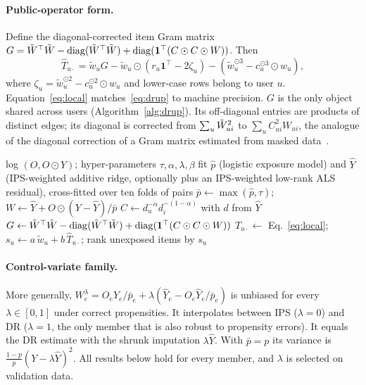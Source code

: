 \paragraph{Public-operator form.}
Define the diagonal-corrected item Gram matrix
$G=\tilde W^\top\tilde W-\operatorname{diag}(\tilde W^\top\tilde W)+\operatorname{diag}(\mathbf 1^\top(C\odot C\odot W))$. Then
\begin{equation}\label{eq:local}
\hat T_{u\cdot}=\tilde w_uG-\tilde w_u\odot(r_u\mathbf 1^\top-2\zeta_u)-(\tilde w_u^{\odot3}-c_u^{\odot3}\odot w_u),
\end{equation}
where $\zeta_u=\tilde w_u^{\odot2}-c_u^{\odot2}\odot w_u$ and lower-case rows
belong to user $u$. Equation~\eqref{eq:local} matches~\eqref{eq:drup} to machine
precision. $G$ is the only object shared across users
(Algorithm~\ref{alg:drup}). Its off-diagonal entries are products of distinct
edges; its diagonal is corrected from $\sum_u\tilde W_{ui}^2$ to
$\sum_uC_{ui}^2W_{ui}$, the analogue of the diagonal correction of a Gram
matrix estimated from masked data~\cite{lounici2014}.

\begin{algorithm}[t]
\caption{DRUP (training-free)}\label{alg:drup}
\begin{algorithmic}[1]
\Require log $(O,O\odot Y)$; hyper-parameters $\tau,\alpha,\lambda,\beta$
\State fit $\hat p$ (logistic exposure model) and $\hat Y$ (IPS-weighted additive ridge, optionally plus an IPS-weighted low-rank ALS residual), cross-fitted over ten folds of pairs
\State $\bar p\gets\max(\hat p,\tau)$; \ $W\gets\hat Y+O\odot(Y-\hat Y)/\bar p$
\State $C\gets d_u^{-\alpha}d_i^{-(1-\alpha)}$ with $d$ from $\hat Y$
\State $G\gets\tilde W^\top\tilde W-\operatorname{diag}(\tilde W^\top\tilde W)+\operatorname{diag}(\mathbf 1^\top(C\odot C\odot W))$ 
\State $\hat T_{u\cdot}\gets$ Eq.~\eqref{eq:local}; \ $s_u\gets a\,\tilde w_u+b\,\hat T_{u\cdot}$; rank unexposed items by $s_u$
\EndFor
\end{algorithmic}
\end{algorithm}

\paragraph{Control-variate family.}
More generally, $W^\lambda_e=O_eY_e/\bar p_e+\lambda(\hat Y_e-O_e\hat Y_e/\bar p_e)$
is unbiased for every $\lambda\in[0,1]$ under correct propensities. It
interpolates between IPS ($\lambda=0$) and DR ($\lambda=1$, the only member that
is also robust to propensity errors). It equals the DR estimate with the
shrunk imputation $\lambda\hat Y$. With $\bar p=p$ its variance is
$\frac{1-p}{p}(Y-\lambda\hat Y)^2$. All results below hold for every member, and
$\lambda$ is selected on validation data.

